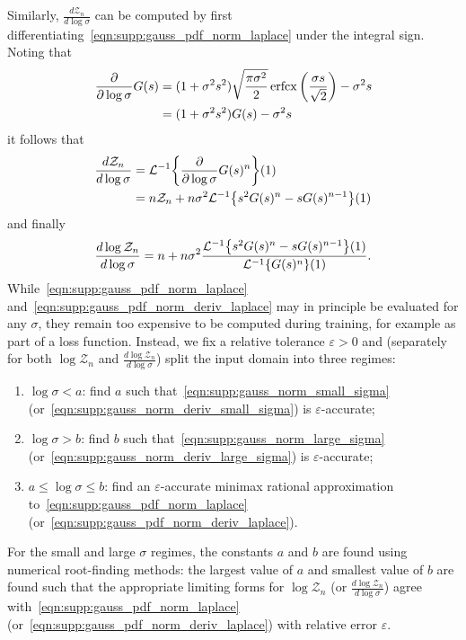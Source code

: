 Similarly, $\frac{d \mathcal{Z}_n}{d \log\sigma}$ can be computed by first differentiating~\eqref{eqn:supp:gauss_pdf_norm_laplace} under the integral sign.
Noting that
\begin{align}
    \frac{\partial}{\partial \log\sigma} G(s)
     & = (1 + \sigma^2 s^2) \sqrt{\frac{\pi \sigma^2}{2}} \operatorname{erfcx}\left(\frac{\sigma s}{\sqrt{2}}\right) - \sigma^2 s \\
     & = (1 + \sigma^2 s^2) G(s) - \sigma^2 s
\end{align}
it follows that
\begin{align}
    \frac{d \mathcal{Z}_n}{d \log\sigma}
     & = \InvLaplace{ \frac{\partial}{\partial \log\sigma} G(s)^n }(1)           \\
     & = n\mathcal{Z}_n + n \sigma^2 \InvLaplace{ s^2 G(s)^n - s G(s)^{n-1} }(1)
\end{align}
and finally
\begin{align}\label{eqn:supp:gauss_pdf_norm_deriv_laplace}
    \frac{d \log\mathcal{Z}_n}{d \log\sigma}
    = n + n \sigma^2 \frac{\InvLaplace{ s^2 G(s)^n - s G(s)^{n-1} }(1)}{\InvLaplace{ G(s)^n }(1)}.
\end{align}
While~\eqref{eqn:supp:gauss_pdf_norm_laplace} and~\eqref{eqn:supp:gauss_pdf_norm_deriv_laplace} may in principle be evaluated for any $\sigma$, they remain too expensive to be computed during training, for example as part of a loss function.
Instead, we fix a relative tolerance $\varepsilon > 0$ and (separately for both $\log\mathcal{Z}_n$ and $\frac{d \log\mathcal{Z}_n}{d \log\sigma}$) split the input domain into three regimes:
\begin{enumerate}
    \item $\log\sigma < a$: find $a$ such that~\eqref{eqn:supp:gauss_norm_small_sigma} (or~\eqref{eqn:supp:gauss_norm_deriv_small_sigma}) is $\varepsilon$-accurate;
    \item $\log\sigma > b$: find $b$ such that~\eqref{eqn:supp:gauss_norm_large_sigma} (or~\eqref{eqn:supp:gauss_norm_deriv_large_sigma}) is $\varepsilon$-accurate;
    \item $a \le \log\sigma \le b$: find an $\varepsilon$-accurate minimax rational approximation to~\eqref{eqn:supp:gauss_pdf_norm_laplace} (or~\eqref{eqn:supp:gauss_pdf_norm_deriv_laplace}).
\end{enumerate}
For the small and large $\sigma$ regimes, the constants $a$ and $b$ are found using numerical root-finding methods: the largest value of $a$ and smallest value of $b$ are found such that the appropriate limiting forms for $\log\mathcal{Z}_n$ (or $\frac{d \log\mathcal{Z}_n}{d \log\sigma}$) agree with~\eqref{eqn:supp:gauss_pdf_norm_laplace} (or~\eqref{eqn:supp:gauss_pdf_norm_deriv_laplace}) with relative error $\varepsilon$.
